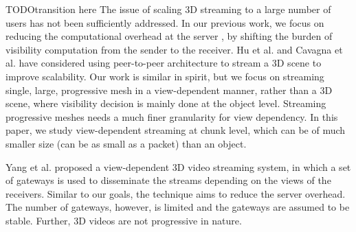 TODO{transition here}
The issue of scaling 3D streaming to a large number of users has not
been sufficiently addressed.  In our previous work, we focus on
reducing the computational overhead at the server \cite{Cheng2008}, by
shifting the burden of visibility computation from the sender to
the receiver.  
Hu et al. \cite{Hu2008} and Cavagna et al. \cite{Cavagna2006} have considered using peer-to-peer architecture to stream a 3D scene
to improve scalability.  Our work is similar in
spirit, but we focus on streaming single, large,
progressive mesh in a view-dependent manner, rather than a 3D scene,
    where visibility decision is mainly done at the object level.
    Streaming 
    progressive meshes needs 
    a much finer granularity for view dependency. 
    In this paper, we study view-dependent streaming at 
    chunk level, which can be of much smaller size (can be as small as a packet) than an object.

Yang et al. \cite{viewcast:yang} proposed a view-dependent 
3D video streaming system, in which a set of gateways is used 
to disseminate the streams depending on the views of the receivers.
Similar to our goals, the technique aims to reduce the server 
overhead.  The number of gateways, however, is limited and the
gateways are assumed to be stable.  Further, 3D videos are not
progressive in nature. 


